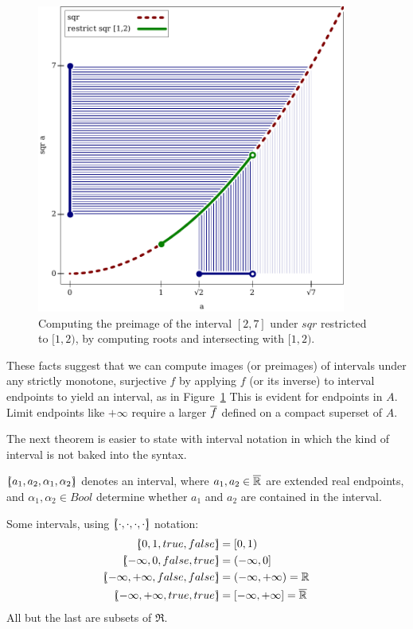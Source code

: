 \begin{figure}[!tb]
\centering
\includegraphics[width=4in]{preimage-by-inverse-image}
\caption[ ]{Computing the preimage of the interval $[2,7]$ under $sqr$ restricted to $[1,2)$, by computing roots and intersecting with $[1,2)$.}
\label{fig:sqr-preimage}
\end{figure}

These facts suggest that we can compute images (or preimages) of intervals under any strictly monotone, surjective $f$ by applying $f$ (or its inverse) to interval endpoints to yield an interval, as in Figure~\ref{fig:sqr-preimage}
This is evident for endpoints in $A$.
Limit endpoints like $+\infty$ require a larger $\cl{f}$ defined on a compact superset of $A$.

The next theorem is easier to state with interval notation in which the kind of interval is not baked into the syntax.

\begin{definition}[interval]
$[\mspace{-4.5mu}(a_1,a_2,\alpha_1,\alpha_2)\mspace{-4.5mu}]$ denotes an interval, where $a_1,a_2 \in \cl{\Re}$ are extended real endpoints, and $\alpha_1,\alpha_2 \in Bool$ determine whether $a_1$ and $a_2$ are contained in the interval.
\end{definition}

\begin{example}
Some intervals, using $[\mspace{-4.5mu}(\cdot,\cdot,\cdot,\cdot)\mspace{-4.5mu}]$ notation:
\begin{equation}
\begin{aligned}
	\ivl{0,1,true,false} &= [0,1) \\
	\ivl{-\infty,0,false,true} &= (-\infty,0] \\
	\ivl{-\infty,+\infty,false,false} &= (-\infty,+\infty) = \Re \\
	\ivl{-\infty,+\infty,true,true} &= [-\infty,+\infty] = \cl{\Re}
\end{aligned}
\end{equation}
All but the last are subsets of $\Re$.
\exampleqed
\end{example}

